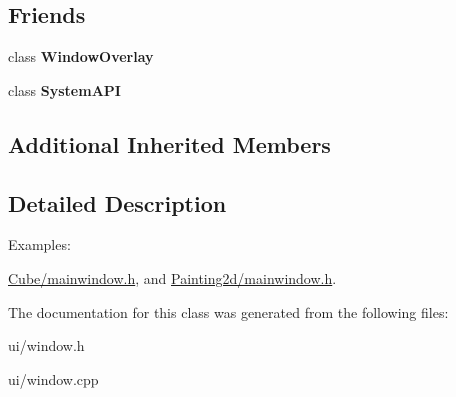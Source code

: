 \subsection*{Friends}
\begin{DoxyCompactItemize}
\item 
\hypertarget{class_tempest_1_1_window_afd869fcf20ed42328fe80e572b16de6e}{class {\bfseries Window\+Overlay}}\label{class_tempest_1_1_window_afd869fcf20ed42328fe80e572b16de6e}

\item 
\hypertarget{class_tempest_1_1_window_a81a96e8e06bdd16bd87b9bff53d8f1d7}{class {\bfseries System\+A\+P\+I}}\label{class_tempest_1_1_window_a81a96e8e06bdd16bd87b9bff53d8f1d7}

\end{DoxyCompactItemize}
\subsection*{Additional Inherited Members}


\subsection{Detailed Description}
\begin{Desc}
\item[Examples\+: ]\par
\hyperlink{_cube_2mainwindow_8h-example}{Cube/mainwindow.\+h}, and \hyperlink{_painting2d_2mainwindow_8h-example}{Painting2d/mainwindow.\+h}.\end{Desc}


The documentation for this class was generated from the following files\+:\begin{DoxyCompactItemize}
\item 
ui/window.\+h\item 
ui/window.\+cpp\end{DoxyCompactItemize}
